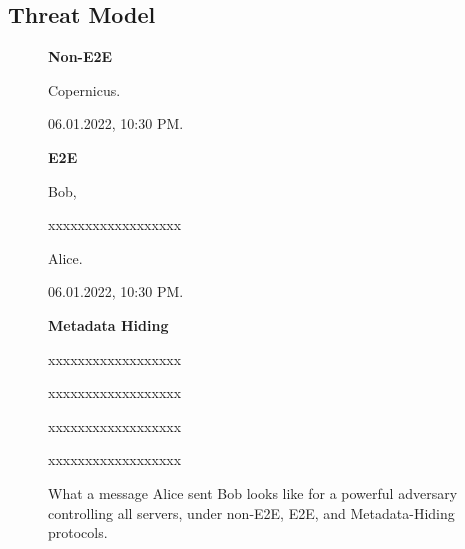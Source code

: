\subsection{Threat Model}
\begin{figure}
\begin{minipage}[t]{0.3333\textwidth}
\textbf{Non-E2E}
\begin{framed}


Copernicus.

06.01.2022, 10:30 PM.
\end{framed}
\end{minipage}%
\begin{minipage}[t]{0.3333\textwidth}
\textbf{E2E}
\begin{framed}
Bob,

xxxxxxxxxxxxxxxxxx

Alice. 

06.01.2022, 10:30 PM.
\end{framed}
\end{minipage}%
\begin{minipage}[t]{0.3333\textwidth}
\textbf{Metadata Hiding}
\begin{framed}
xxxxxxxxxxxxxxxxxx

xxxxxxxxxxxxxxxxxx

xxxxxxxxxxxxxxxxxx

xxxxxxxxxxxxxxxxxx
\end{framed}
\end{minipage}
\caption{What a message Alice sent Bob looks like for a powerful adversary controlling all servers, under non-E2E, E2E, and Metadata-Hiding protocols.}
\end{figure}


